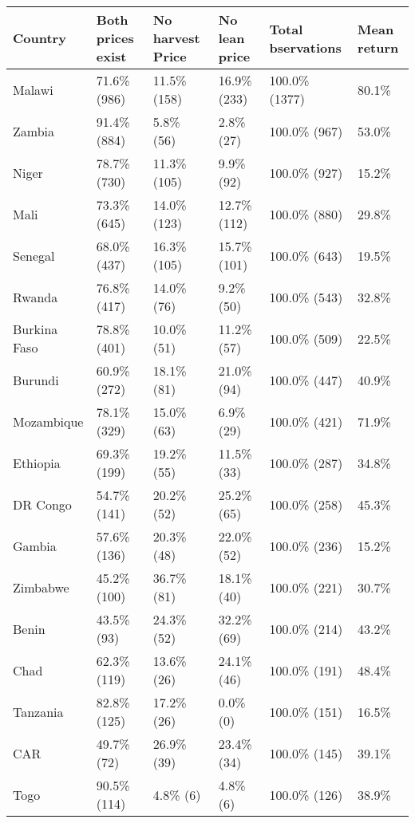 \begin{table}[ht]
\centering
\begin{tabular}{llllll}
  \hline
Country & Both prices exist & No harvest Price & No lean price & Total bservations & Mean return \\ 
  \hline
Malawi & 71.6\%  (986) & 11.5\%  (158) & 16.9\%  (233) & 100.0\% (1377) & 80.1\% \\ 
  Zambia & 91.4\%  (884) & 5.8\%   (56) & 2.8\%   (27) & 100.0\%  (967) & 53.0\% \\ 
  Niger & 78.7\%  (730) & 11.3\%  (105) & 9.9\%   (92) & 100.0\%  (927) & 15.2\% \\ 
  Mali & 73.3\%  (645) & 14.0\%  (123) & 12.7\%  (112) & 100.0\%  (880) & 29.8\% \\ 
  Senegal & 68.0\%  (437) & 16.3\%  (105) & 15.7\%  (101) & 100.0\%  (643) & 19.5\% \\ 
  Rwanda & 76.8\%  (417) & 14.0\%   (76) & 9.2\%   (50) & 100.0\%  (543) & 32.8\% \\ 
  Burkina Faso & 78.8\%  (401) & 10.0\%   (51) & 11.2\%   (57) & 100.0\%  (509) & 22.5\% \\ 
  Burundi & 60.9\%  (272) & 18.1\%   (81) & 21.0\%   (94) & 100.0\%  (447) & 40.9\% \\ 
  Mozambique & 78.1\%  (329) & 15.0\%   (63) & 6.9\%   (29) & 100.0\%  (421) & 71.9\% \\ 
  Ethiopia & 69.3\%  (199) & 19.2\%   (55) & 11.5\%   (33) & 100.0\%  (287) & 34.8\% \\ 
  DR Congo & 54.7\%  (141) & 20.2\%   (52) & 25.2\%   (65) & 100.0\%  (258) & 45.3\% \\ 
  Gambia & 57.6\%  (136) & 20.3\%   (48) & 22.0\%   (52) & 100.0\%  (236) & 15.2\% \\ 
  Zimbabwe & 45.2\%  (100) & 36.7\%   (81) & 18.1\%   (40) & 100.0\%  (221) & 30.7\% \\ 
  Benin & 43.5\%   (93) & 24.3\%   (52) & 32.2\%   (69) & 100.0\%  (214) & 43.2\% \\ 
  Chad & 62.3\%  (119) & 13.6\%   (26) & 24.1\%   (46) & 100.0\%  (191) & 48.4\% \\ 
  Tanzania & 82.8\%  (125) & 17.2\%   (26) & 0.0\%    (0) & 100.0\%  (151) & 16.5\% \\ 
  CAR & 49.7\%   (72) & 26.9\%   (39) & 23.4\%   (34) & 100.0\%  (145) & 39.1\% \\ 
  Togo & 90.5\%  (114) & 4.8\%    (6) & 4.8\%    (6) & 100.0\%  (126) & 38.9\% \\ 

\end{tabular}
\end{table}
